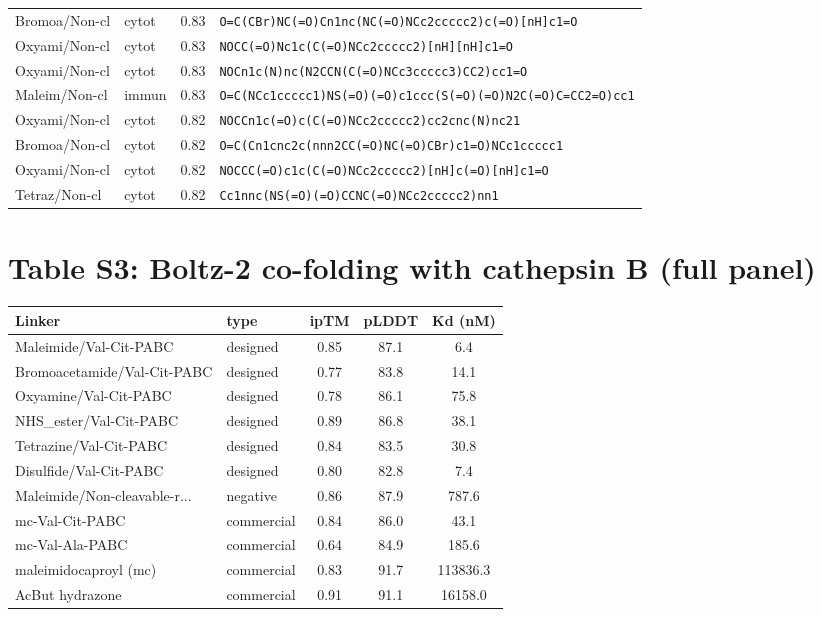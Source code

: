 \documentclass[10pt]{article}
\begin{document}
\begin{longtable}{l l c p{9cm}}
Bromoa/Non-cl & cytot & 0.83 & \texttt{O=C(CBr)NC(=O)Cn1nc(NC(=O)NCc2ccccc2)c(=O)[nH]c1=O} \\
Oxyami/Non-cl & cytot & 0.83 & \texttt{NOCC(=O)Nc1c(C(=O)NCc2ccccc2)[nH][nH]c1=O} \\
Oxyami/Non-cl & cytot & 0.83 & \texttt{NOCn1c(N)nc(N2CCN(C(=O)NCc3ccccc3)CC2)cc1=O} \\
Maleim/Non-cl & immun & 0.83 & \texttt{O=C(NCc1ccccc1)NS(=O)(=O)c1ccc(S(=O)(=O)N2C(=O)C=CC2=O)cc1} \\
Oxyami/Non-cl & cytot & 0.82 & \texttt{NOCCn1c(=O)c(C(=O)NCc2ccccc2)cc2cnc(N)nc21} \\
Bromoa/Non-cl & cytot & 0.82 & \texttt{O=C(Cn1cnc2c(nnn2CC(=O)NC(=O)CBr)c1=O)NCc1ccccc1} \\
Oxyami/Non-cl & cytot & 0.82 & \texttt{NOCCC(=O)c1c(C(=O)NCc2ccccc2)[nH]c(=O)[nH]c1=O} \\
Tetraz/Non-cl & cytot & 0.82 & \texttt{Cc1nnc(NS(=O)(=O)CCNC(=O)NCc2ccccc2)nn1} \\
\bottomrule\end{longtable}
\section{Table S3: Boltz-2 co-folding with cathepsin B (full panel)}
\begin{longtable}{l l c c c}\toprule
Linker & type & ipTM & pLDDT & Kd (nM) \\ \midrule\endhead
Maleimide/Val-Cit-PABC & designed & 0.85 & 87.1 & 6.4 \\
Bromoacetamide/Val-Cit-PABC & designed & 0.77 & 83.8 & 14.1 \\
Oxyamine/Val-Cit-PABC & designed & 0.78 & 86.1 & 75.8 \\
NHS\_ester/Val-Cit-PABC & designed & 0.89 & 86.8 & 38.1 \\
Tetrazine/Val-Cit-PABC & designed & 0.84 & 83.5 & 30.8 \\
Disulfide/Val-Cit-PABC & designed & 0.80 & 82.8 & 7.4 \\
Maleimide/Non-cleavable-r... & negative & 0.86 & 87.9 & 787.6 \\
mc-Val-Cit-PABC & commercial & 0.84 & 86.0 & 43.1 \\
mc-Val-Ala-PABC & commercial & 0.64 & 84.9 & 185.6 \\
maleimidocaproyl (mc) & commercial & 0.83 & 91.7 & 113836.3 \\
AcBut hydrazone & commercial & 0.91 & 91.1 & 16158.0 \\
\bottomrule\end{longtable}
\end{document}
